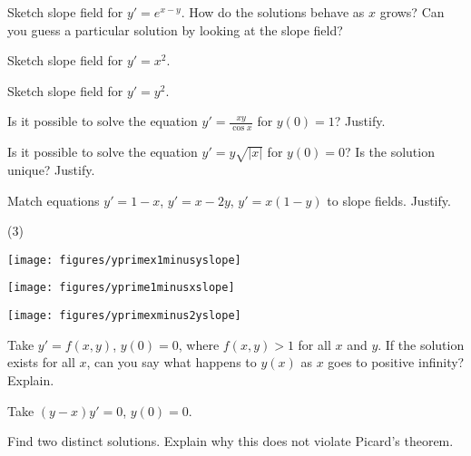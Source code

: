 \begin{exercise}
Sketch slope field for $y'=e^{x-y}$.  How do the solutions behave as $x$
grows?  Can you guess a particular solution by looking at the slope
field?
\end{exercise}

\begin{exercise}
Sketch slope field for $y'=x^2$.
\end{exercise}

\begin{exercise}
Sketch slope field for $y'=y^2$.
\end{exercise}

\begin{exercise}
Is it possible to solve the equation $y' = \frac{xy}{\cos x}$ for $y(0) = 1$?
Justify.
\end{exercise}

\begin{exercise}
Is it possible to solve the equation $y' = y\sqrt{\lvert x\rvert}$ for
$y(0) = 0$?  Is the solution unique?
Justify.
\end{exercise}

\begin{samepage}
\begin{exercise}
Match equations $y'=1-x$, $y'=x-2y$, $y' = x(1-y)$ to slope fields.
Justify.
\begin{tasks}(3)
\task
\parbox[c]{1.75in}{\texttt{[image: figures/yprimex1minusyslope]}}
\task
\parbox[c]{1.75in}{\texttt{[image: figures/yprime1minusxslope]}}
\task
\parbox[c]{1.75in}{\texttt{[image: figures/yprimexminus2yslope]}}
\end{tasks}
\end{exercise}
\end{samepage}

\begin{exercise}[challenging]
Take $y' = f(x,y)$, $y(0) = 0$, where $f(x,y) > 1$
for all $x$ and $y$.  If
the solution exists for all $x$, can you say
what happens to $y(x)$ as $x$ goes to positive infinity?  Explain.
\end{exercise}

\begin{exercise}[challenging]
Take $(y-x)y' = 0$, $y(0) = 0$.
\begin{tasks}
\task Find two distinct solutions.
\task Explain why this does not violate Picard's theorem.  
\end{tasks}
\end{exercise}


